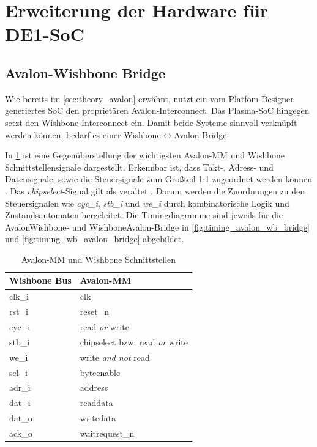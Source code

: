 \section{Erweiterung der Hardware für DE1-SoC}
\label{sec:impl_extend_hw_for_de1_soc}

\subsection{Avalon-Wishbone Bridge}

Wie bereits im \cref{sec:theory_avalon} erwähnt, nutzt ein vom Platfom Designer generiertes \gls{SoC} den proprietären Avalon-\gls{Interconnect}. Das Plasma-\gls{SoC} hingegen setzt den Wishbone-\gls{Interconnect} ein. Damit beide Systeme sinnvoll verknüpft werden können, bedarf es einer Wishbone{$\leftrightarrow$}Avalon-\gls{Bridge}. 

In \cref{tab:avalonmm_wishbone_comparison} ist eine Gegenüberstellung der wichtigsten Avalon-MM und Wishbone Schnittstellensignale dargestellt. Erkennbar ist, dass Takt-, Adress- und Datensignale, sowie die Steuersignale zum Großteil 1:1 zugeordnet werden können \cite{article:porting_from_wb_to_avalon}. Das \textit{chipselect}-Signal gilt als veraltet \cite[Appendix A]{manual:avalon_spec}. Darum werden die Zuordnungen zu den Steuersignalen wie \textit{cyc\_i}, \textit{stb\_i} und \textit{we\_i} durch kombinatorische Logik und Zustandsautomaten hergeleitet. Die Timingdiagramme sind jeweils für die Avalon\textrightarrow{}Wishbone- und Wishbone\textrightarrow{}Avalon-Bridge in \cref{fig:timing_avalon_wb_bridge} und \cref{fig:timing_wb_avalon_bridge} abgebildet.

\begin{table}[!htbp]
	\bigskip
	\centering
	\begin{tabular}{ | l | l | }
		\hline
	    \textbf{Wishbone Bus} & \textbf{Avalon-MM} \\
	    \hline
 	    {clk\_i} & {clk} \\
 	    \hline
  	    {rst\_i} & {reset\_n} \\
  	    \hline
  	    {cyc\_i} & {read \textit{or} write} \\
  	    \hline
  	    {stb\_i} & {chipselect bzw. read \textit{or} write} \\
  	    \hline
     	{we\_i} & {write \textit{and not} read} \\
  	    \hline
  	    {sel\_i} & {byteenable} \\
  	    \hline
  	    {adr\_i} & {address} \\
  	    \hline
	    {dat\_i} & {readdata} \\
	    \hline
   	    {dat\_o} & {writedata} \\
   	    \hline
   	    {ack\_o} & {waitrequest\_n} \\
		\hline
	\end{tabular}
	
	\caption{Avalon-MM und Wishbone Schnittstellen}
	\label{tab:avalonmm_wishbone_comparison}
\end{table}


